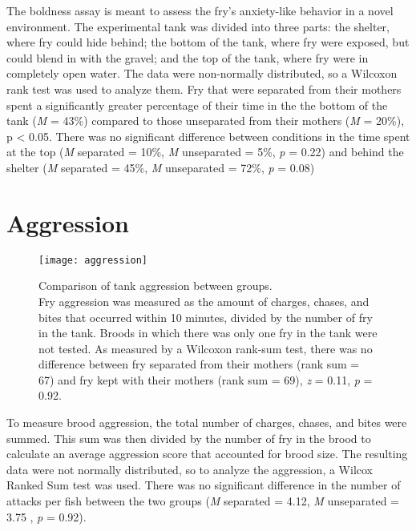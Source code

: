 \documentclass[12pt,twoside]{reedthesis}
\begin{document}
The boldness assay is meant to assess the fry's anxiety-like behavior in a novel
environment. The experimental tank was divided into three parts: the shelter,
where fry could hide behind; the bottom of the tank, where fry were exposed, but
could blend in with the gravel; and the top of the tank, where fry were in
completely open water. The data were non-normally distributed, so a Wilcoxon
rank test was used to analyze them. Fry that were separated from their mothers spent a
significantly greater percentage of their time in the the bottom of the tank
(\textit{M} = 43\%) compared to those unseparated from their mothers (\textit{M}
= 20\%), p < 0.05. There was no significant difference between conditions in the
time spent at the top (\textit{M} separated = 10\%, \textit{M} unseparated =
5\%, \textit{p} = 0.22) and behind the shelter (\textit{M} separated = 45\%,
\textit{M} unseparated = 72\%, \textit{p} = 0.08) 

\section{Aggression}
\begin{figure}[htbp] 
\begin{center} 
\texttt{[image: aggression]}
\caption[Comparison of tank aggression between
groups]{\footnotesize{Comparison of tank aggression between groups.\\ Fry aggression was measured
  as the amount of charges, chases, and bites that occurred within 10 minutes,
  divided by the number of fry in the tank. Broods in which there was only one
  fry in the tank were not tested. As measured by a Wilcoxon rank-sum test,
  there was no difference between fry separated from their mothers (rank sum =
  67) and fry kept with their mothers (rank sum = 69), \textit{z} = 0.11,
  \textit{p} = 0.92}.}
\label{subd}
\end{center} 
\end{figure}

To measure brood aggression, the total number of charges, chases, and
bites were summed. This sum was then divided by the number of fry in the brood
to calculate an average aggression score that accounted for brood size. The
resulting data were not normally distributed, so to analyze the aggression, a Wilcox Ranked Sum test was used. There was no
significant difference in the number of attacks per fish between the two groups (\textit{M} separated = 4.12, \textit{M} unseparated = 3.75 , \textit{p} = 0.92).
\end{document}
